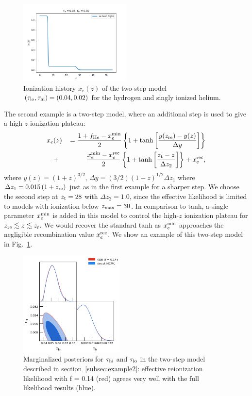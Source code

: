 \documentclass[prd,twocolumn,amsmath,amssymb,floatfix,superscriptaddress,nofootinbib]{revtex4-1}
\newcommand{\refssec}[1]{section~\ref{subsec:#1}}
\newcommand{\zmax}{z_{\rm max}}
\newcommand{\xemin}{x_e^{\rm min}}
\newcommand{\tauhi}{\tau_{\rm hi}}
\newcommand{\taulo}{\tau_{\rm lo}}
\newcommand{\bea}{\begin{eqnarray}}
\newcommand{\eea}{\end{eqnarray}}
\begin{document}
\begin{figure}
\includegraphics[width=0.5\textwidth]{results/cosmomc_kde/taulo_prior_test/plot_xez_taulo_0p04_tauhi_0p02.png}
\caption{Ionization history $x_e(z)$ of the two-step model $(\taulo, \tauhi) = (0.04, 0.02)$ for the hydrogen and singly ionized helium.
}
\label{fig:two_step_model}
\end{figure}
 
 
The second example is a two-step model, where an additional step is used to give a high-$z$ ionization plateau: 
 \bea
x_e&(z)&\,= \frac{1+f_{\rm He} - \xemin}{2}\left\{  1+ \tanh\left[ \frac{y(z_{\rm re})-y(z)}{\Delta y} \right] \right\} \notag \\
&+& \frac{\xemin - x_e^{\rm rec}}{2}\left\{  1+ \tanh\left[ \frac{z_{\rm t}-z}{\Delta z_{2}} \right] \right\} + x_e^{\rm rec},
 \label{eqn:tanh_highz}
 \eea
where $y(z)=(1+z)^{3/2}$, $\Delta y=(3/2)(1+z)^{1/2}\Delta z_1$ where $\Delta z_1 = 0.015\, (1+z_{\rm re})$ just as in the first example for a sharper step.
We choose the second step at $z_{\rm t}=28$ with $\Delta z_2 = 1.0$, since the effective likelihood is limited to models with ionization below $\zmax=30$. 
In comparison to tanh, a single parameter $\xemin$ is added in this model to control the high-$z$ ionization plateau for $z_{\rm re} \lesssim z \lesssim z_t$. We would recover the standard tanh as $\xemin$ approaches the negligible recombination value $x_e^{\rm rec}$. We show an example
of this two-step model in Fig.~\ref{fig:two_step_model}.

\begin{figure}[t]
\includegraphics[width=0.47\textwidth]{results/cosmomc_kde/pl18_tanh_highz_test5_run1_vs_relike_tanh_highz_test8_run9_f0p14_taulo_prior_0p03_zre_prior_6p1_taulo_prior_0p0_tri.png}
\caption{Marginalized posteriors for $\tauhi$ and $\taulo$ in the two-step model described in \refssec{example2}: effective reionization likelihood with f = 0.14 (red) agrees very well with the full likelihood results (blue). 
}
\label{fig:two_parameter_model_2D}
\end{figure}
\end{document}
